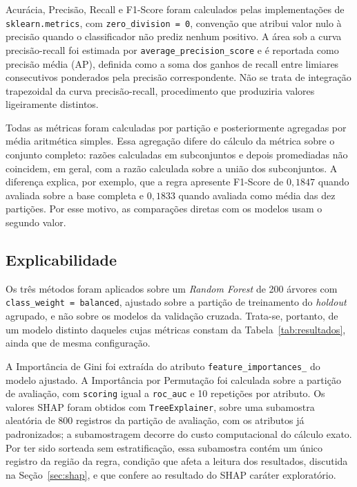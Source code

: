 Acurácia, Precisão, Recall e F1-Score foram calculados pelas implementações de \texttt{sklearn.metrics}, com \texttt{zero\_division = 0}, convenção que atribui valor nulo à precisão quando o classificador não prediz nenhum positivo. A área sob a curva precisão-recall foi estimada por \texttt{average\_precision\_score} e é reportada como precisão média (AP), definida como a soma dos ganhos de recall entre limiares consecutivos ponderados pela precisão correspondente. Não se trata de integração trapezoidal da curva precisão-recall, procedimento que produziria valores ligeiramente distintos.

Todas as métricas foram calculadas por partição e posteriormente agregadas por média aritmética simples. Essa agregação difere do cálculo da métrica sobre o conjunto completo: razões calculadas em subconjuntos e depois promediadas não coincidem, em geral, com a razão calculada sobre a união dos subconjuntos. A diferença explica, por exemplo, que a regra apresente F1-Score de $0{,}1847$ quando avaliada sobre a base completa e $0{,}1833$ quando avaliada como média das dez partições. Por esse motivo, as comparações diretas com os modelos usam o segundo valor.

\subsection{Explicabilidade}
\label{sec:explic_metodo}

Os três métodos foram aplicados sobre um \textit{Random Forest} de 200 árvores com \texttt{class\_weight = balanced}, ajustado sobre a partição de treinamento do \textit{holdout} agrupado, e não sobre os modelos da validação cruzada. Trata-se, portanto, de um modelo distinto daqueles cujas métricas constam da Tabela~\ref{tab:resultados}, ainda que de mesma configuração.

A Importância de Gini foi extraída do atributo \texttt{feature\_importances\_} do modelo ajustado. A Importância por Permutação foi calculada sobre a partição de avaliação, com \texttt{scoring} igual a \texttt{roc\_auc} e 10 repetições por atributo. Os valores SHAP foram obtidos com \texttt{TreeExplainer}, sobre uma subamostra aleatória de 800 registros da partição de avaliação, com os atributos já padronizados; a subamostragem decorre do custo computacional do cálculo exato. Por ter sido sorteada sem estratificação, essa subamostra contém um único registro da região da regra, condição que afeta a leitura dos resultados, discutida na Seção~\ref{sec:shap}, e que confere ao resultado do SHAP caráter exploratório.

